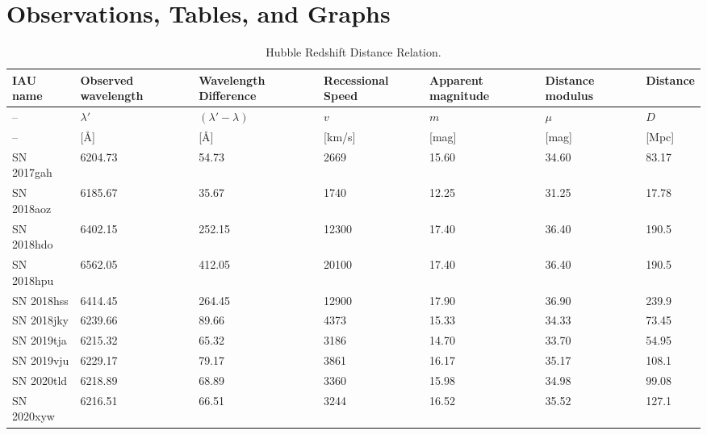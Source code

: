 \documentclass[11pt]{article}
\begin{document}
\section{Observations, Tables, and Graphs}
\begin{landscape}
\clearpage
\thispagestyle{empty}
\begin{table}[H]
\caption{Hubble Redshift Distance Relation.}
\begin{center}
\def\arraystretch{1.5}
\begin{tabular}{| L | L | L | L | L | L | L |}
	\hline
	IAU name & Observed wavelength & Wavelength Difference & Recessional Speed & Apparent magnitude & Distance modulus & Distance \\ \hline
	-- & $\lambda'$ & $(\lambda' - \lambda)$ & $v$ & $m$ & $\mu$ & $D$ \\ \hline
	-- & [\r{A}] & [\r{A}] & [km/s] & [mag] & [mag] & [Mpc] \\ \hline
	\hline
	SN 2017gah & 6204.73 & 54.73 & 2669 & 15.60 & 34.60 & 83.17 \\ \hline
	SN 2018aoz & 6185.67 & 35.67 & 1740 & 12.25 & 31.25 & 17.78 \\ \hline
	SN 2018hdo & 6402.15 & 252.15 & 12300 & 17.40 & 36.40 & 190.5 \\ \hline
	SN 2018hpu & 6562.05 & 412.05 & 20100 & 17.40 & 36.40 & 190.5 \\ \hline
	SN 2018hss & 6414.45 & 264.45 & 12900 & 17.90 & 36.90 & 239.9 \\ \hline
	SN 2018jky & 6239.66 & 89.66 & 4373 & 15.33 & 34.33 & 73.45 \\ \hline
	SN 2019tja & 6215.32 & 65.32 & 3186 & 14.70 & 33.70 & 54.95 \\ \hline
	SN 2019vju & 6229.17 & 79.17 & 3861 & 16.17 & 35.17 & 108.1 \\ \hline
	SN 2020tld & 6218.89 & 68.89 & 3360 & 15.98 & 34.98 & 99.08 \\ \hline
	SN 2020xyw & 6216.51 & 66.51 & 3244 & 16.52 & 35.52 & 127.1 \\
	\hline
\end{tabular}
\end{center}
\label{table:redshift-distance}
\end{table}
\clearpage
\end{landscape}
\end{document}
